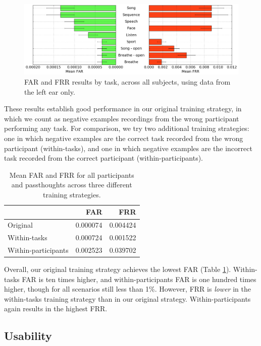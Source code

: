 \documentclass{sigchi}
\begin{document}
\begin{figure}[t]
\centering
\includegraphics[width=.9\linewidth]{./figures/mean-far-and-frr-by-task.png}
\caption{FAR and FRR results by task, across all subjects, using data from the left ear only.}
\label{fig:meanByTask}
\end{figure}

These results establish good performance in our original training strategy, in which we count as negative examples recordings from the wrong participant performing any task. For comparison, we try two additional training strategies: one in which negative examples are the correct task recorded from the wrong participant (within-tasks), and one in which negative examples are the incorrect task recorded from the correct participant (within-participants).

\begin{table}[h]
\begin{center}
\begin{tabular}{lrr}
 & \textbf{FAR} & \textbf{FRR}\\
\hline
Original & 0.000074 & 0.004424\\
Within-tasks & 0.000724 & 0.001522\\
Within-participants & 0.002523 & 0.039702\\
\hline
\end{tabular}
\end{center}
\caption{Mean FAR and FRR for all participants and passthoughts across three different training strategies.}
\label{tab:compare}
\end{table}

Overall, our original training strategy achieves the lowest FAR (Table \ref{tab:compare}). Within-tasks FAR is ten times higher, and within-participants FAR is one hundred times higher, though for all scenarios still less than 1\%.
However, FRR is \textit{lower} in the within-tasks training strategy than in our original strategy. Within-participants again results in the highest FRR.

\subsection{Usability}
\end{document}
